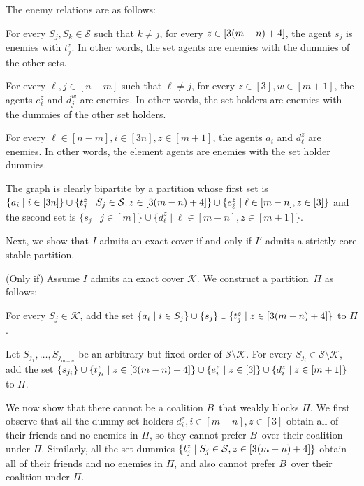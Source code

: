\documentclass[a4paper,fleqn]{cas-sc}
\newcommand{\partition}{\ensuremath{\Pi}\xspace}
\newcommand{\blockingCoalition}{\ensuremath{B}\xspace}
\newcommand{\sets}{\ensuremath{\mathcal{S}}}
\newcommand{\elements}{\ensuremath{[3n]}}
\newcommand{\sset}[1]{\ensuremath{S_{#1}}}
\newcommand{\ecov}{\ensuremath{\mathcal{K}}}
\begin{document}
{The enemy relations are as follows:
\begin{compactitem}
\item For every $\sset j, \sset k \in \sets$ such that $k \neq j$, for every $z \in [3(m -n) + 4]$, the agent $s_j$ is enemies with $t^z_j$. In other words, the set agents are enemies with the dummies of the other sets.
\item For every $\ell, j \in [n  - m]$ such that $\ell \neq j$, for every $z \in [3], w \in [m + 1]$, the agents $e^z_\ell$ and $d^w_j$ are enemies.
In other words, the set holders are enemies with the dummies of the other set holders.
\item For every $\ell \in [n - m], i \in \elements, z \in [m + 1]$, the agents $a_i$ and $d^z_\ell$ are enemies. In other words, the element agents are enemies with the set holder dummies.
\end{compactitem}
The graph is clearly bipartite by a partition whose first set is $\{a_i \mid i \in \elements\} \cup \{t^z_j \mid \sset j \in \sets, z \in \dumcount\} \cup \{e^z_\ell \mid \ell \in [m - n], z \in [3]\}$ and the second set is $\{s_j \mid j \in [m]\} \cup \{d^z_\ell \mid \ell \in [m - n], z \in [m + 1]\}$.

Next, we show that $I$ admits an exact cover if and only if $I'$ admits a strictly core stable partition.

(Only if) Assume $I$ admits an exact cover \ecov. We construct a partition~\partition as follows:
\begin{compactitem}
\item For every $\sset j \in \ecov$, add the set $\{a_i \mid i \in \sset j\} \cup \{s_j\} \cup \{t^z_j \mid z \in \dumcount\}$ to \partition.
\item Let $\sset {j_1}, \dots, \sset {j_{m - n}}$ be an arbitrary but fixed order of $\sets \setminus \ecov$.
For every $\sset {j_i} \in \sets \setminus \ecov$, add the set $\{s_{j_i}\} \cup \{t^z_{j_i} \mid z \in [3(m -n) + 4]\} \cup \{e^z_i \mid z \in [3]\} \cup \{d^z_i \mid z \in [m + 1]\}$ to \partition.
\end{compactitem}


We now show that there cannot be a coalition \blockingCoalition\ that weakly blocks \partition.
We first observe that all the dummy set holders $d^z_i, i \in [m -n ], z \in [3]$ obtain all of their friends and no enemies in \partition, so they cannot prefer \blockingCoalition\ over their coalition under \partition. 
Similarly, all the set dummies $\{t^z_j \mid \sset j \in \sets, z \in \dumcount\}$ obtain all of their friends and no enemies in \partition, and also cannot prefer \blockingCoalition\ over their coalition under \partition.

}
\end{document}
